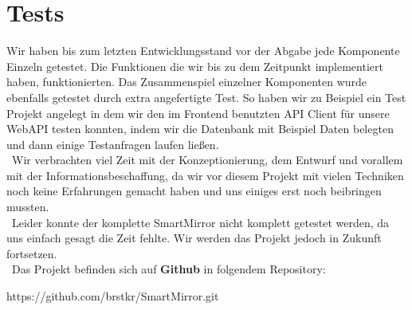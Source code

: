 \section{Tests}
Wir haben bis zum letzten Entwicklungsstand vor der Abgabe jede Komponente Einzeln getestet. Die Funktionen die wir bis zu dem Zeitpunkt implementiert haben, funktionierten. Das Zusammenspiel einzelner Komponenten wurde ebenfalls getestet durch extra angefertigte Test. So haben wir zu Beispiel ein Test Projekt angelegt in dem wir den im Frontend benutzten API Client für unsere WebAPI testen konnten, indem wir die Datenbank mit Beispiel Daten belegten und dann einige Testanfragen laufen ließen.\\\
Wir verbrachten viel Zeit mit der Konzeptionierung, dem Entwurf und vorallem mit der Informationsbeschaffung, da wir vor diesem Projekt mit vielen Techniken noch keine Erfahrungen gemacht haben und uns einiges erst noch beibringen mussten.\\\
Leider konnte der komplette SmartMirror nicht komplett getestet werden, da uns einfach gesagt die Zeit fehlte. Wir werden das Projekt jedoch in Zukunft fortsetzen.
\\\
Das Projekt befinden sich auf \textbf{Github} in folgendem Repository: 

https://github.com/brstkr/SmartMirror.git\\\